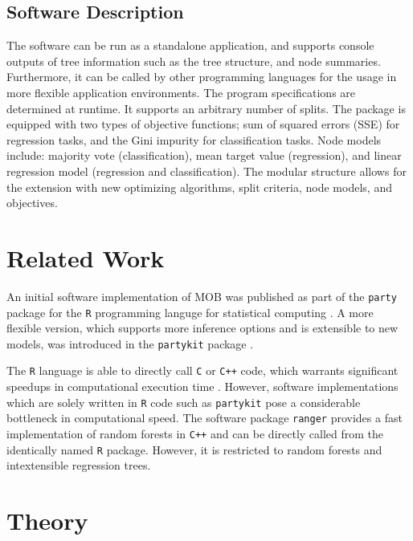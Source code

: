 \documentclass[a4paper, 11pt]{article}
\begin{document}
\subsection{Software Description}

The software can be run as a standalone application, and supports console outputs of tree information such as the tree structure, and node summaries. Furthermore, it can be called by other programming languages for the usage in more flexible application environments. The program specifications are determined at runtime. It supports an arbitrary number of splits.
The package is equipped with two types of objective functions; sum of squared errors (SSE) for regression tasks, and the Gini impurity for classification tasks. Node models include: majority vote (classification), mean target value (regression), and linear regression model (regression and classification).
The modular structure allows for the extension with 
new optimizing algorithms, split criteria, node models, and objectives. 

\section{Related Work}

An initial software implementation of MOB was published as part of the \texttt{party} package \cite{party_package} for the \texttt{R} programming languge for statistical computing \cite{r_citation}. A more flexible version, which supports more inference options and is extensible to new models, was introduced in the \texttt{partykit} package \cite{partykit_package}. 
\par
The \texttt{R} language is able to directly call \texttt{C} or \texttt{C++} code, which warrants significant speedups in computational execution time \cite{eddelbuettel_rcpp}. However, software implementations which are solely written in \texttt{R} code such as \texttt{partykit} pose a considerable bottleneck in computational speed.
The software package \texttt{ranger} \cite{ranger_package} provides a fast implementation of random forests in \texttt{C++} and can be directly called from the identically named \texttt{R} package. However, it is restricted to random forests and intextensible regression trees.

\section{Theory}
\end{document}
